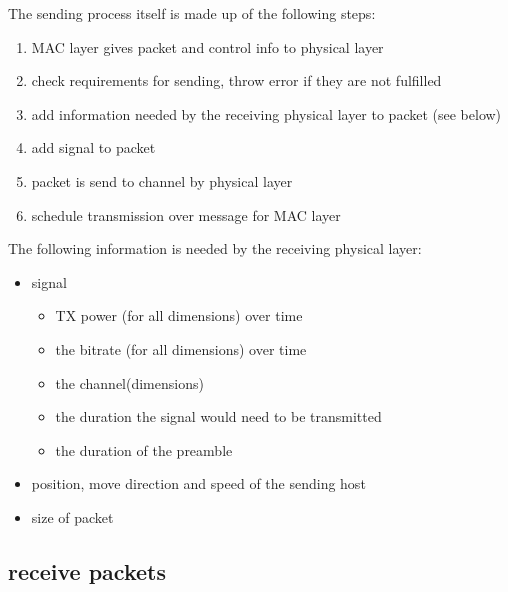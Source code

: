 The sending process itself is made up of the following steps:

\begin{enumerate}
 \item MAC layer gives packet and control info to physical layer
 \item check requirements for sending, throw error if they are not fulfilled
 \item add information needed by the receiving physical layer to packet (see below)
 \item add signal to packet
 \item packet is send to channel by physical layer
 \item schedule transmission over message for MAC layer
\end{enumerate}

The following information is needed by the receiving physical layer:

\begin{itemize}
\item signal
	\begin{itemize}
	\item TX power (for all dimensions) over time
	\item the bitrate (for all dimensions) over time
	\item the channel(dimensions)
	\item the duration the signal would need to be transmitted
	\item the duration of the preamble
	
	\end{itemize}
\item position, move direction and speed of the sending host
\item size of packet
\end{itemize}

\subsection{receive packets}
\label{receivePackets}

